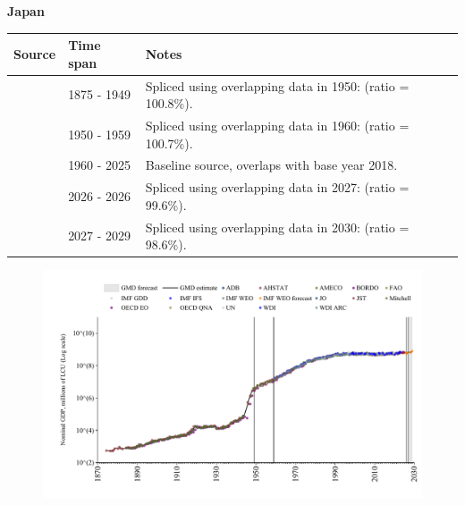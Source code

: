 \documentclass[12pt,a4paper,landscape]{article}
\begin{document}
\begin{adjustbox}{max totalsize={\paperwidth}{\paperheight},center}
\begin{minipage}[t][\textheight][t]{\textwidth}
\vspace*{0.5cm}
{}
\begin{center}
{\Large\bfseries Japan}
\end{center}
\vspace{0.5cm}
\begin{table}[H]
\centering
\small
\begin{tabular}{|l|l|l|}
\hline
\textbf{Source} & \textbf{Time span} & \textbf{Notes} \\
\hline
\rowcolor{white}\cite{JST}& 1875 - 1949 &Spliced using overlapping data in 1950: (ratio = 100.8\%).\\
\rowcolor{lightgray}\cite{IMF_GDD}& 1950 - 1959 &Spliced using overlapping data in 1960: (ratio = 100.7\%).\\
\rowcolor{white}\cite{OECD_EO}& 1960 - 2025 &Baseline source, overlaps with base year 2018.\\
\rowcolor{lightgray}\cite{AMECO}& 2026 - 2026 &Spliced using overlapping data in 2027: (ratio = 99.6\%).\\
\rowcolor{white}\cite{IMF_WEO_forecast}& 2027 - 2029 &Spliced using overlapping data in 2030: (ratio = 98.6\%).\\
\hline
\end{tabular}
\end{table}
\begin{figure}[H]
\centering
\includegraphics[width=\textwidth,height=0.6\textheight,keepaspectratio]{graphs/JPN_nGDP.pdf}
\end{figure}
\end{minipage}
\end{adjustbox}
\end{document}
